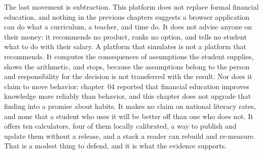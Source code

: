 The last movement is subtraction. This platform does not replace formal
financial education, and nothing in the previous chapters suggests a browser
application can do what a curriculum, a teacher, and time do. It does not advise
anyone on their money: it recommends no product, ranks no option, and tells no
student what to do with their salary. A platform that simulates is not a
platform that recommends. It computes the consequences of assumptions the
student supplies, shows the arithmetic, and stops, because the assumptions
belong to the person and responsibility for the decision is not transferred
with the result. Nor does it claim to move behavior: chapter~04 reported that
financial education improves knowledge more reliably than behavior, and this
chapter does not upgrade that finding into a promise about habits. It makes no
claim on national literacy rates, and none that a student who uses it will be
better off than one who does not. It offers ten calculators, four of them
locally calibrated, a way to publish and update them without a release, and a
stack a reader can rebuild and re-measure. That is a modest thing to defend, and
it is what the evidence supports.
